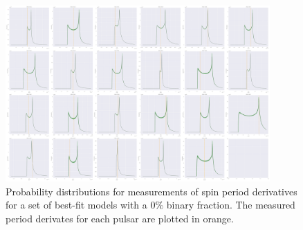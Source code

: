 \begin{figure}
	\centering
	\includegraphics[width=0.9\textwidth]{figures/pulsar_posteriors/Paz_spin.png}
	\caption{Probability distributions for measurements of spin period derivatives for a set of
		best-fit models with a $0\%$ binary fraction. The measured period derivates for each
		pulsar are plotted in orange. }
	\label{fig:pulsar_Paz_spin}
\end{figure}




